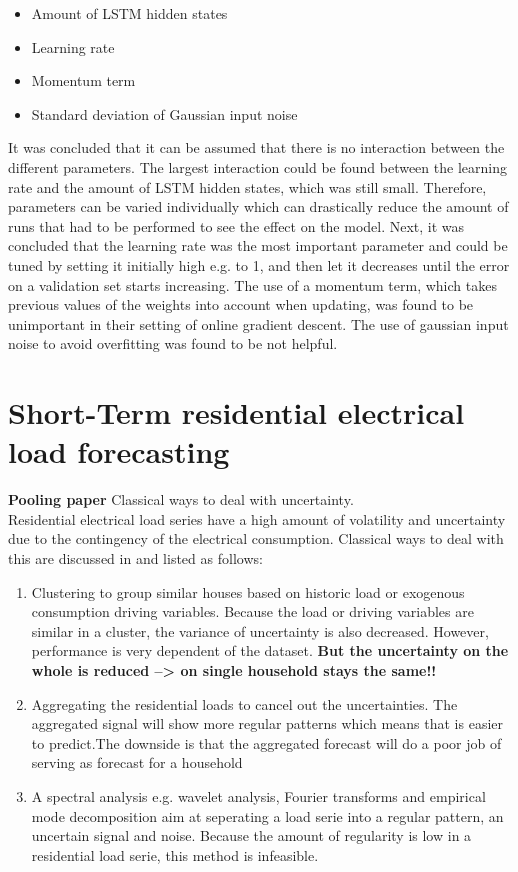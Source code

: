 \begin{itemize}
	\item Amount of LSTM hidden states
	\item Learning rate
	\item Momentum term
	\item Standard deviation of Gaussian input noise
\end{itemize}

It was concluded that it can be assumed that there is no interaction between the different parameters. The largest interaction could be found between the learning rate and the amount of LSTM hidden states, which was still small. Therefore, parameters can be varied individually which can drastically reduce the amount of runs that had to be performed to see the effect on the model. Next, it was concluded that the learning rate was the most important parameter and could be tuned by setting it initially high e.g. to 1, and then let it decreases until the error on a validation set starts increasing. The use of a momentum term, which takes previous values of the weights into account when updating, was found to be unimportant in their setting of online gradient descent. The use of gaussian input noise to avoid overfitting was found to be not helpful. 

\section{Short-Term residential electrical load forecasting}\label{s:Short-Term residential electrical load forecasting}
\textbf{Pooling paper}
Classical ways to deal with uncertainty.\\
Residential electrical load series have a high amount of volatility and uncertainty due to the contingency of the electrical consumption. Classical ways to deal with this are discussed in \cite{Shi2018} and listed as follows:
\begin{enumerate}
	\item Clustering to group similar houses based on historic load or exogenous consumption driving variables. Because the load or driving variables are similar in a cluster, the variance of uncertainty is also decreased. However, performance is very dependent of the dataset. \textbf{But the uncertainty on the whole is reduced --> on single household stays the same!!}
	\item Aggregating the residential loads to cancel out the uncertainties. The aggregated signal will show more regular patterns which means that is easier to predict.The downside is that the aggregated forecast will do a poor job of serving as forecast for a household
	\item A spectral analysis e.g. wavelet analysis, Fourier transforms and empirical mode decomposition aim at seperating a load serie into a regular pattern, an uncertain signal and noise. Because the amount of regularity is low in a residential load serie, this method is infeasible.
\end{enumerate}




